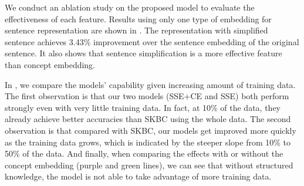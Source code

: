 We conduct an ablation study on the proposed model to evaluate 
the effectiveness of each feature. Results using only one type of 
embedding for sentence representation are shown in . 
The representation with simplified sentence achieves 3.43\% improvement 
over the sentence embedding of the original sentence. It also shows that
sentence simplification is a more effective feature than concept embedding. 

In , we compare the models' capability given increasing
amount of training data. The first observation is that our two models (SSE+CE
and SSE) both perform strongly even with very little training data. In fact,
at 10\% of the data, they already achieve better accuracies than SKBC using
the whole data. The second observation is that compared with SKBC, our models
get improved more quickly as the training data grows, which is indicated by
the steeper slope from 10\% to 50\% of the data. 
And finally, when comparing the effects with or without the concept embedding
(purple and green lines), we can see that without structured knowledge,
the model is not able to take advantage of more training data. 

